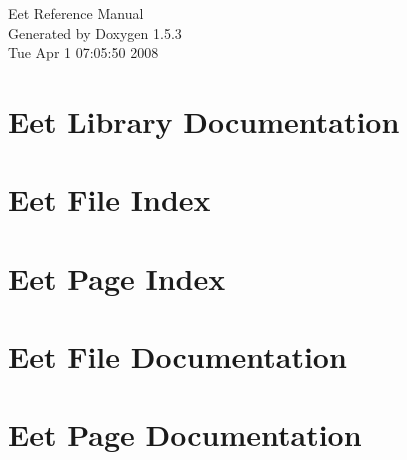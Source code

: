\documentclass[a4paper]{book}
\begin{document}
\begin{titlepage}
\vspace*{7cm}
\begin{center}
{\Large Eet Reference Manual}\\
\vspace*{1cm}
{\large Generated by Doxygen 1.5.3}\\
\vspace*{0.5cm}
{\small Tue Apr 1 07:05:50 2008}\\
\end{center}
\end{titlepage}
\clearemptydoublepage
{}
\tableofcontents
\clearemptydoublepage
{}
\chapter{Eet Library Documentation }
\label{index}\hypertarget{index}{}
\chapter{Eet File Index}

\chapter{Eet Page Index}

\chapter{Eet File Documentation}


\chapter{Eet Page Documentation}

\printindex
\end{document}
